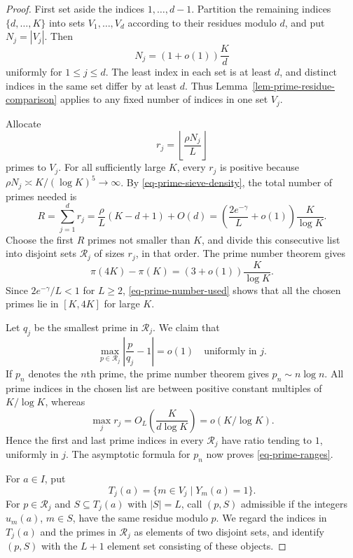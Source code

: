 \documentclass[11pt,reqno]{amsart}
\numberwithin{equation}{section}
\begin{document}
\begin{proof}
First set aside the indices $1,\ldots,d-1$. Partition the remaining indices $\{d,\ldots,K\}$ into sets $V_1,\ldots,V_d$ according to their residues modulo $d$, and put $N_j=|V_j|$. Then
\[
 N_j=(1+o(1))\frac Kd
\]
uniformly for $1\le j\le d$. The least index in each set is at least $d$, and distinct indices in the same set differ by at least $d$. Thus Lemma~\ref{lem-prime-residue-comparison} applies to any fixed number of indices in one set $V_j$.

Allocate
\[
 r_j=\left\lfloor\frac{\rho N_j}{L}\right\rfloor
\]
primes to $V_j$. For all sufficiently large $K$, every $r_j$ is positive because $\rho N_j\asymp K/(\log K)^5\to\infty$. By \eqref{eq-prime-sieve-density}, the total number of primes needed is
\begin{equation}\label{eq-prime-number-used}
 R=\sum_{j=1}^d r_j
  =\frac\rho L(K-d+1)+O(d)
  =\left(\frac{2e^{-\gamma}}L+o(1)\right)\frac K{\log K}.
\end{equation}
Choose the first $R$ primes not smaller than $K$, and divide this consecutive list into disjoint sets $\mathcal R_j$ of sizes $r_j$, in that order. The prime number theorem \cite[Ch.~14]{Apostol} gives
\[
 \pi(4K)-\pi(K)=(3+o(1))\frac K{\log K}.
\]
Since $2e^{-\gamma}/L<1$ for $L\ge2$, \eqref{eq-prime-number-used} shows that all the chosen primes lie in $[K,4K]$ for large $K$.

Let $q_j$ be the smallest prime in $\mathcal R_j$. We claim that
\begin{equation}\label{eq-prime-ranges}
 \max_{p\in\mathcal R_j}\left|\frac p{q_j}-1\right|=o(1)
 \quad\text{uniformly in }j.
\end{equation}
If $p_n$ denotes the $n$th prime, the prime number theorem gives $p_n\sim n\log n$. All prime indices in the chosen list are between positive constant multiples of $K/\log K$, whereas
\[
 \max_j r_j=O_L\left(\frac K{d\log K}\right)
            =o(K/\log K).
\]
Hence the first and last prime indices in every $\mathcal R_j$ have ratio tending to $1$, uniformly in $j$. The asymptotic formula for $p_n$ now proves \eqref{eq-prime-ranges}.

For $a\in I$, put
\[
 T_j(a)=\{m\in V_j\mid Y_m(a)=1\}.
\]
For $p\in\mathcal R_j$ and $S\subseteq T_j(a)$ with $|S|=L$, call $(p,S)$ admissible if the integers $u_m(a)$, $m\in S$, have the same residue modulo $p$. We regard the indices in $T_j(a)$ and the primes in $\mathcal R_j$ as elements of two disjoint sets, and identify $(p,S)$ with the $L+1$ element set consisting of these objects.


\end{proof}
\end{document}
